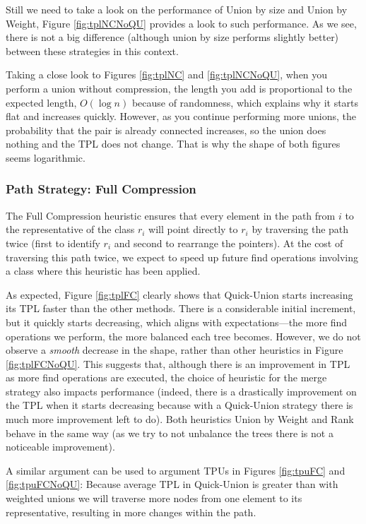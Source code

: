 Still we need to take a look on the performance of Union by size and Union by Weight, Figure \ref{fig:tplNCNoQU} provides a look to such performance. As we see, there is not a big difference (although union by size performs slightly better) between these strategies in this context.



Taking a close look to Figures \ref{fig:tplNC} and \ref{fig:tplNCNoQU}, when you perform a union without compression, the length you add is proportional to the expected length, \(O(\log n)\) because of randomness, which explains why it starts flat and increases quickly. However, as you continue performing more unions, the probability that the pair is already connected increases, so the union does nothing and the TPL does not change. That is why the shape of both figures seems logarithmic.

\subsubsection{Path Strategy: Full Compression}
The Full Compression heuristic ensures that every element in the path from \( i \) to the representative of the class \( r_i \) will point directly to \( r_i \) by traversing the path twice (first to identify \( r_i \) and second to rearrange the pointers). At the cost of traversing this path twice, we expect to speed up future find operations involving a class where this heuristic has been applied. 

As expected, Figure \ref{fig:tplFC} clearly shows that Quick-Union starts increasing its TPL faster than the other methods. There is a considerable initial increment, but it quickly starts decreasing, which aligns with expectations—the more find operations we perform, the more balanced each tree becomes. However, we do not observe a \textit{smooth} decrease in the shape, rather than other heuristics in Figure \ref{fig:tplFCNoQU}. This suggests that, although there is an improvement in TPL as more find operations are executed, the choice of heuristic for the merge strategy also impacts performance (indeed, there is a drastically improvement on the TPL when it starts decreasing because with a Quick-Union strategy there is much more improvement left to do). Both heuristics Union by Weight and Rank behave in the same way (as we try to not unbalance the trees there is not a noticeable improvement).

A similar argument can be used to argument TPUs in Figures \ref{fig:tpuFC} and \ref{fig:tpuFCNoQU}: Because average TPL in Quick-Union is greater than with weighted unions we will traverse more nodes from one element to its representative, resulting in more changes within the path.


